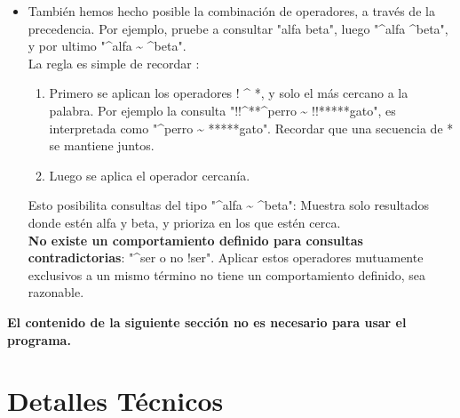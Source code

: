 \documentclass{article}
\begin{document}
\begin{itemize}
\begin{itemize}
      \item También hemos hecho posible la combinación de operadores, a través de la precedencia. Por ejemplo, pruebe a consultar "alfa  beta", luego "\^{}alfa \^{}beta", y por ultimo "\^{}alfa \~{} \^{}beta".\\
      La regla es simple de recordar : 
      \begin{enumerate}
        \item Primero se aplican los operadores ! \^{} *, y solo el más cercano a la palabra. Por ejemplo la consulta "!!\^{}**\^{}perro \~{} !!*****gato",  es interpretada como "\^{}perro \~{} *****gato". Recordar que una secuencia de * se mantiene juntos.
        \item Luego se aplica el operador cercanía.
      \end{enumerate}
      Esto posibilita consultas del tipo "\^{}alfa \~{} \^{}beta": Muestra solo resultados donde estén alfa y beta, y prioriza en los que estén cerca.\\
      {\bfseries No existe un comportamiento definido para consultas contradictorias}: "\^{}ser o no !ser". Aplicar estos operadores mutuamente exclusivos a un mismo término no tiene un comportamiento definido, sea razonable.
    \end{itemize}
\end{itemize}

{\bfseries El contenido de la siguiente sección no es necesario para usar el programa.}

\section{Detalles Técnicos}
\end{document}
